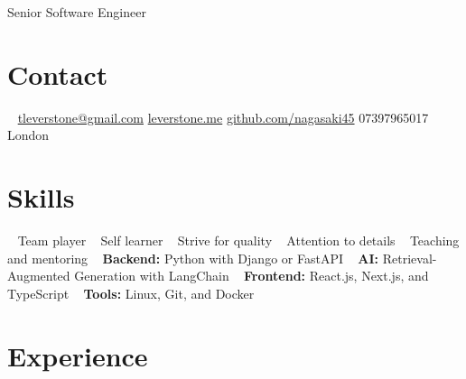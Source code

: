 \documentclass[]{friggeri-cv}
\begin{document}
       {Senior Software Engineer}



\begin{aside}
\section{Contact}
~
\href{mailto:tleverstone@gmail.com}{tleverstone@gmail.com}
\href{http://leverstone.me}{leverstone.me}
\href{https://github.com/nagasaki45}{github.com/nagasaki45}
07397965017
London
~
\section{Skills}
~
Team player
~
Self learner
~
Strive for quality
~
Attention to details
~
Teaching and mentoring
~
\textbf{Backend:} Python with Django or FastAPI
~
\textbf{AI:} Retrieval-Augmented Generation with LangChain
~
\textbf{Frontend:} React.js, Next.js, and TypeScript
~
\textbf{Tools:} Linux, Git, and Docker
~
\end{aside}



\section{Experience}
\end{document}
